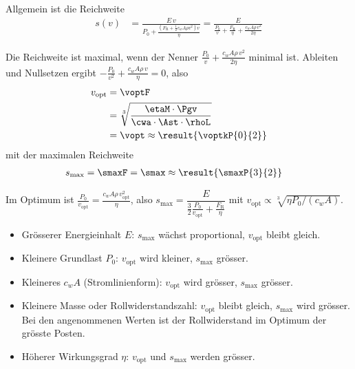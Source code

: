 \begin{abcliste}
\abc Allgemein ist die Reichweite
\begin{align}
 s(v) &= \frac{E\,v}{P_0+\frac{\left(F_\mathrm{R}+\frac{1}{2}c_w A\rho v^2\right)v}{\eta}} = \frac{E}{\frac{P_0}{v}+\frac{F_\mathrm{R}}{\eta}+\frac{c_w A\rho\,v^2}{2\eta}}
\end{align}
\begin{center}
\end{center}
Die Reichweite ist maximal, wenn der Nenner $\frac{P_0}{v}+\frac{c_w A\rho\,v^2}{2\eta}$ minimal ist. Ableiten und Nullsetzen ergibt $-\frac{P_0}{v^2}+\frac{c_w A\rho\,v}{\eta} = 0$, also
\begin{align}
 v_\mathrm{opt} &= \voptF \\
   &= \sqrt[3]{\frac{\etaM\cdot\Pgv}{\cwa\cdot\Ast\cdot\rhoL}} \\
   &= \vopt \approx \result{\voptkP{0}{2}}
\end{align}
mit der maximalen Reichweite
\begin{align}
 s_\mathrm{max} &= \smaxF = \smax \approx \result{\smaxP{3}{2}}
\end{align}

\abc Im Optimum ist $\frac{P_0}{v_\mathrm{opt}} = \frac{c_w A\rho\,v_\mathrm{opt}^2}{\eta}$, also $s_\mathrm{max} = \dfrac{E}{\frac{3}{2}\frac{P_0}{v_\mathrm{opt}}+\frac{F_\mathrm{R}}{\eta}}$ mit $v_\mathrm{opt} \propto \sqrt[3]{\eta P_0/(c_w A)}$.
\begin{itemize}
\item Grösserer Energieinhalt $E$: $s_\mathrm{max}$ wächst proportional, $v_\mathrm{opt}$ bleibt gleich.
\item Kleinere Grundlast $P_0$: $v_\mathrm{opt}$ wird kleiner, $s_\mathrm{max}$ grösser.
\item Kleineres $c_w A$ (Stromlinienform): $v_\mathrm{opt}$ wird grösser, $s_\mathrm{max}$ grösser.
\item Kleinere Masse oder Rollwiderstandszahl: $v_\mathrm{opt}$ bleibt gleich, $s_\mathrm{max}$ wird grösser. Bei den angenommenen Werten ist der Rollwiderstand im Optimum der grösste Posten.
\item Höherer Wirkungsgrad $\eta$: $v_\mathrm{opt}$ und $s_\mathrm{max}$ werden grösser.
\end{itemize}
\end{abcliste}
